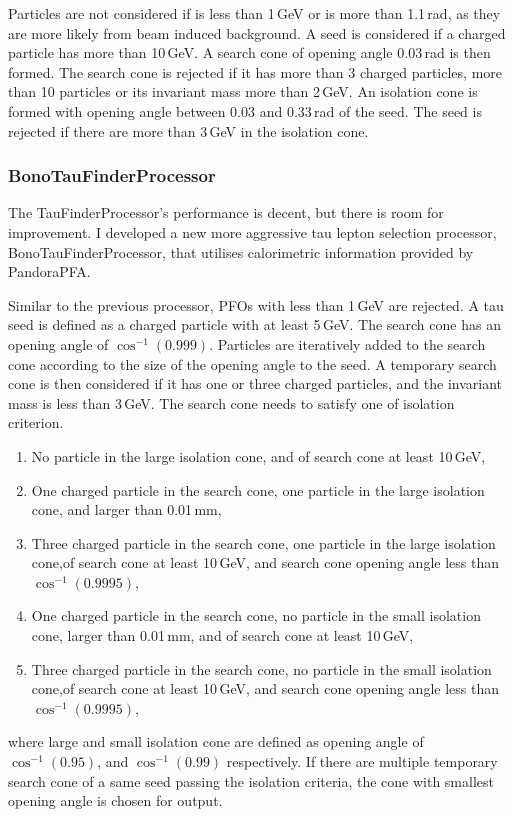 Particles are not considered if \pT is less than 1\,GeV or \absCosTheta is more than 1.1\,rad, as they are more likely from beam induced background. A seed is considered if a charged particle has \pT more than 10\,GeV. A search cone of opening angle 0.03\,rad is then formed. The search cone is rejected if it has more than 3 charged particles, more than 10 particles or its invariant mass more than 2\,GeV. An isolation cone is formed with opening angle between 0.03 and 0.33\,rad of the seed. The seed is rejected if there are more than 3\,GeV in the isolation cone.

\subsubsection{BonoTauFinderProcessor}

The TauFinderProcessor's performance is decent, but there is room for improvement. I developed a new more aggressive tau lepton selection processor, BonoTauFinderProcessor, that utilises calorimetric information provided by PandoraPFA.

Similar to the previous processor, PFOs with \pT less than 1\,GeV are rejected. A tau seed is defined as a charged particle with \pT at least 5\,GeV. The search cone has an opening angle of $\cos^{-1}(0.999)$. Particles are iteratively added to the search cone according to the size of the opening angle to the seed. A temporary search cone is then considered if it has one or three charged particles, and the invariant mass is less than 3\,GeV. The search cone needs to satisfy one of isolation criterion.
\begin{enumerate}
\item No particle in the large isolation cone, and \pT of search cone at least 10\,GeV,
\item One charged particle in the search cone, one particle in the large isolation cone, and \rZero larger than 0.01\,mm,
\item Three charged particle in the search cone, one particle in the large isolation cone,\pT of search cone at least 10\,GeV, and search cone opening angle less than $\cos^{-1}(0.9995)$,
\item One charged particle in the search cone, no particle in the small isolation cone, \rZero larger than 0.01\,mm, and \pT of search cone at least 10\,GeV,
\item Three charged particle in the search cone, no particle in the small isolation cone,\pT of search cone at least 10\,GeV, and search cone opening angle less than $\cos^{-1}(0.9995)$,
\end{enumerate}
where large and small isolation cone are defined as opening angle of $\cos^{-1}(0.95)$, and $\cos^{-1}(0.99)$ respectively.
If there are multiple temporary search cone of a same seed passing the isolation criteria, the cone with smallest opening angle is chosen for output.


